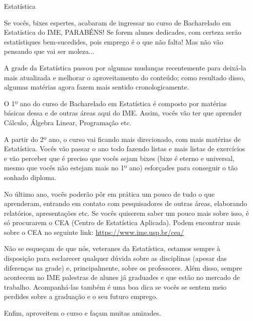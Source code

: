 \begin{subsecao}{Estatística}

Se vocês, bixes espertes, acabaram de ingressar no curso de Bacharelado em
Estatística do IME, PARABÉNS! Se forem alunes dedicades, com certeza serão
estatístiques bem-sucedides, pois emprego é o que não falta! Mas não vão
pensando que vai ser moleza...

A grade da Estatística passou por algumas mudanças recentemente
para deixá-la mais atualizada e melhorar o aproveitamento do conteúdo;
como resultado disso, algumas matérias agora fazem mais sentido cronologicamente.

O 1º ano do curso de Bacharelado em Estatística é composto por matérias básicas
dessa e de outras áreas aqui do IME. Assim, vocês vão ter que aprender Cálculo,
Álgebra Linear, Programação etc.

A partir do 2º ano, o curso vai ficando mais direcionado, com mais matérias de
Estatística. Vocês vão passar o ano todo fazendo listas e mais listas de
exercícios e vão perceber que é preciso que vocês sejam bixes (bixe é eterno e
universal, mesmo que vocês não estejam mais no 1º ano) esforçades para conseguir o tão
sonhado diploma.

No último ano, vocês poderão pôr em prática um pouco de tudo o que
aprenderam, entrando em contato com pesquisadores de outras áreas, elaborando
relatórios, apresentações etc. Se vocês quiserem saber um pouco mais sobre
isso, é só procurarem o CEA (Centro de Estatística Aplicada). Podem encontrar
mais sobre o CEA no seguinte link: \url{https://www.ime.usp.br/cea/}

Não se esqueçam de que nós, veteranes da Estatística, estamos sempre à
disposição para esclarecer qualquer dúvida sobre as disciplinas (apesar %
das diferenças na grade) e, principalmente, sobre os professores. Além disso,
sempre acontecem no IME palestras de alunes já graduades e que estão no
mercado de trabalho. Acompanhá-las também é uma boa dica se vocês se sentem meio
perdides sobre a graduação e o seu futuro emprego.

Enfim, aproveitem o curso e façam muitas amizades.

\end{subsecao}

